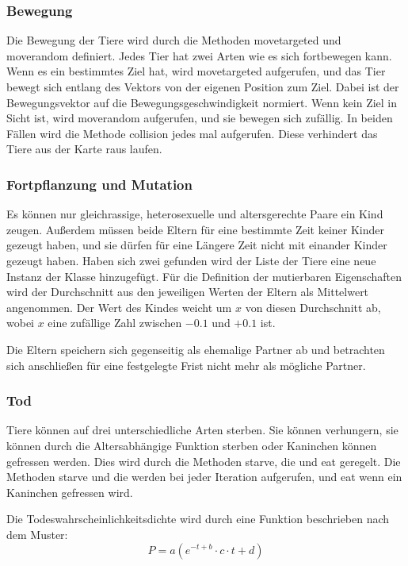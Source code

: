 \documentclass[12pt]{article}
\begin{document}
\subsubsection{Bewegung}
Die Bewegung der Tiere wird durch die Methoden \colorbox{gray!40}{movetargeted}
und \colorbox{gray!40}{moverandom} definiert.
Jedes Tier hat zwei Arten wie es sich fortbewegen kann.
Wenn es ein bestimmtes Ziel hat, wird \colorbox{gray!40}{movetargeted}
aufgerufen, und das Tier bewegt sich entlang des Vektors von der eigenen Position zum Ziel.
Dabei ist der Bewegungsvektor auf die Bewegungsgeschwindigkeit normiert.
Wenn kein Ziel in Sicht ist, wird \colorbox{gray!40}{moverandom} aufgerufen, und sie bewegen sich zufällig.
In beiden Fällen wird die Methode \colorbox{gray!40}{collision} jedes mal aufgerufen.
Diese verhindert das Tiere aus der Karte raus laufen.
\subsubsection{Fortpflanzung und Mutation}
Es können nur gleichrassige, heterosexuelle und altersgerechte Paare ein Kind zeugen.
Außerdem müssen beide Eltern für eine bestimmte Zeit keiner Kinder gezeugt haben, und sie dürfen für eine Längere Zeit nicht mit einander Kinder gezeugt haben.
Haben sich zwei gefunden wird der Liste der Tiere eine neue Instanz der Klasse hinzugefügt.
Für die Definition der mutierbaren  Eigenschaften wird der Durchschnitt aus den jeweiligen Werten der Eltern als Mittelwert angenommen.
Der Wert des Kindes weicht um $x$ von diesen Durchschnitt ab, wobei $x$ eine zufällige Zahl zwischen $-0.1$ und $+0.1$ ist.

Die Eltern speichern sich gegenseitig als ehemalige Partner ab und betrachten
sich anschließen für eine festgelegte Frist nicht mehr als mögliche Partner. 
\subsubsection{Tod}
Tiere können auf drei unterschiedliche Arten sterben.
Sie können verhungern, sie können durch die Altersabhängige Funktion sterben
oder Kaninchen können gefressen werden.
Dies wird durch die Methoden \colorbox{gray!40}{starve}, \colorbox{gray!40}{die}
und \colorbox{gray!40}{eat} geregelt.
Die Methoden \colorbox{gray!40}{starve} und \colorbox{gray!40}{die} werden bei
jeder Iteration aufgerufen, und \colorbox{gray!40}{eat} wenn ein Kaninchen gefressen wird.

Die Todeswahrscheinlichkeitsdichte wird durch eine Funktion beschrieben nach dem Muster:
\begin{equation}
    P = a ( {e}^{-t + b} \cdot c \cdot t + d)
\end{equation}
\end{document}
